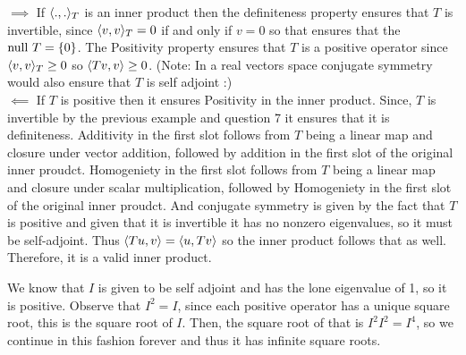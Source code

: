 \documentclass[10pt, twocolumn]{article}
\begin{document}
\begin{q}[8]
    $ \implies $ If $ \langle .,.\rangle_T $ is an inner product then the definiteness property ensures that $ T $ is invertible, 
    since $ \langle v, v\rangle_T = 0 $ if and only if $ v = 0 $ so that ensures that the $ \text{null } T = \{0\} $.
    The Positivity property ensures that $ T $ is a positive operator since $ \langle v, v\rangle_T \geq 0 $ so $ \langle Tv, v\rangle \geq 0 $.
    (Note: In a real vectors space conjugate symmetry would also ensure that $ T $ is self adjoint :) \\
    $ \impliedby $ If $ T $ is positive then it ensures Positivity in the inner product. 
    Since, $ T $ is invertible by the previous example and question 7 it ensures that it is definiteness. 
    Additivity in the first slot follows from $ T $ being a linear map and closure under vector addition, followed by addition in the first slot of the original inner proudct.
    Homogeniety in the first slot follows from $ T $ being a linear map and closure under scalar multiplication, followed by Homogeniety in the first slot of the original inner proudct.
    And conjugate symmetry is given by the fact that $ T $ is positive and given that it is invertible it has no nonzero eigenvalues, so it must be self-adjoint. 
    Thus $ \langle Tu, v\rangle = \langle u, Tv\rangle $ so the inner product follows that as well. 
    Therefore, it is a valid inner product.
\end{q}

\begin{q}[9]
    We know that $ I $ is given to be self adjoint and has the lone eigenvalue of 1, so it is positive.
    Observe that $ I^2 = I $, since each positive operator has a unique square root, this is the square root of $ I $. 
    Then, the square root of  that  is $ I^2 I^2 = I^4 $, so we continue in this fashion forever and thus it has infinite square roots.
\end{q}

\begin{q}[11]
    
\end{q}
\end{document}
